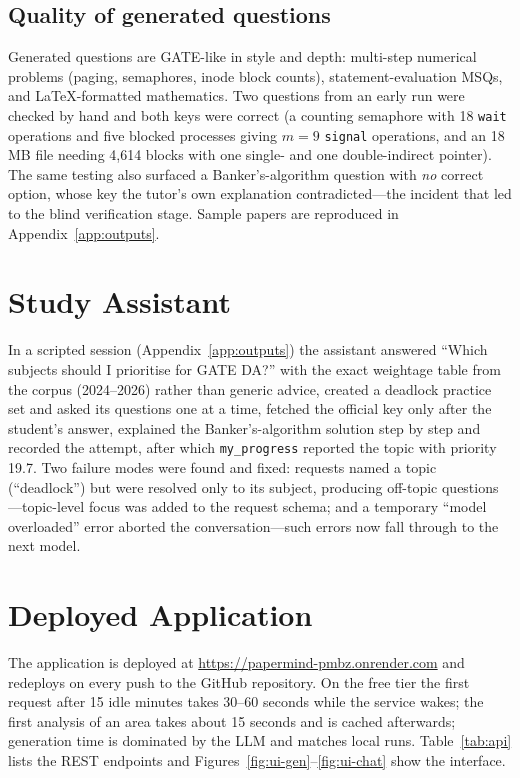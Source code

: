 \subsection{Quality of generated questions}
Generated questions are GATE-like in style and depth: multi-step numerical problems (paging, semaphores, inode block
counts), statement-evaluation MSQs, and LaTeX-formatted mathematics. Two questions from an early run were checked by
hand and both keys were correct (a counting semaphore with 18 \texttt{wait} operations and five blocked processes giving
$m=9$ \texttt{signal} operations, and an 18\,MB file needing 4,614 blocks with one single- and one double-indirect
pointer). The same testing also surfaced a Banker's-algorithm question with \emph{no} correct option, whose key the
tutor's own explanation contradicted---the incident that led to the blind verification stage. Sample papers are
reproduced in Appendix~\ref{app:outputs}.

\section{Study Assistant}
In a scripted session (Appendix~\ref{app:outputs}) the assistant answered ``Which subjects should I prioritise for GATE
DA?'' with the exact weightage table from the corpus (2024--2026) rather than generic advice, created a deadlock practice
set and asked its questions one at a time, fetched the official key only after the student's answer, explained the
Banker's-algorithm solution step by step and recorded the attempt, after which \texttt{my\_progress} reported the topic
with priority 19.7. Two failure modes were found and fixed: requests named a topic (``deadlock'') but were resolved only
to its subject, producing off-topic questions---topic-level focus was added to the request schema; and a temporary
``model overloaded'' error aborted the conversation---such errors now fall through to the next model.

\section{Deployed Application}
The application is deployed at \url{https://papermind-pmbz.onrender.com} and redeploys on every push to the GitHub
repository. On the free tier the first request after 15 idle minutes takes 30--60 seconds while the service wakes; the
first analysis of an area takes about 15 seconds and is cached afterwards; generation time is dominated by the LLM and
matches local runs. Table~\ref{tab:api} lists the REST endpoints and Figures~\ref{fig:ui-gen}--\ref{fig:ui-chat} show the
interface.

